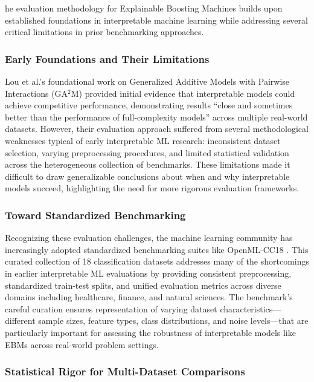 \documentclass[12pt]{article}
\begin{document}
he evaluation methodology for Explainable Boosting Machines builds upon established foundations in interpretable machine learning while addressing several critical limitations in prior benchmarking approaches.

\subsubsection{Early Foundations and Their Limitations}

Lou et al.'s foundational work on Generalized Additive Models with Pairwise Interactions (GA$^2$M) \cite{lou2013} provided initial evidence that interpretable models could achieve competitive performance, demonstrating results ``close and sometimes better than the performance of full-complexity models'' across multiple real-world datasets. However, their evaluation approach suffered from several methodological weaknesses typical of early interpretable ML research: inconsistent dataset selection, varying preprocessing procedures, and limited statistical validation across the heterogeneous collection of benchmarks. These limitations made it difficult to draw generalizable conclusions about when and why interpretable models succeed, highlighting the need for more rigorous evaluation frameworks.

\subsubsection{Toward Standardized Benchmarking}

Recognizing these evaluation challenges, the machine learning community has increasingly adopted standardized benchmarking suites like OpenML-CC18 \cite{bischl2021}. This curated collection of 18 classification datasets addresses many of the shortcomings in earlier interpretable ML evaluations by providing consistent preprocessing, standardized train-test splits, and unified evaluation metrics across diverse domains including healthcare, finance, and natural sciences. The benchmark's careful curation ensures representation of varying dataset characteristics---different sample sizes, feature types, class distributions, and noise levels---that are particularly important for assessing the robustness of interpretable models like EBMs across real-world problem settings.

\subsubsection{Statistical Rigor for Multi-Dataset Comparisons}
\end{document}
